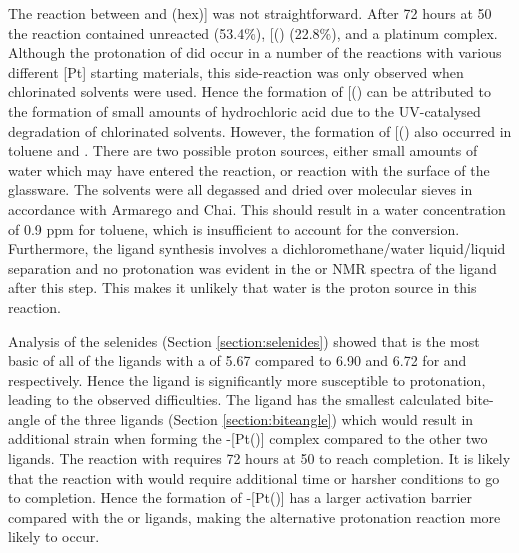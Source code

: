 The reaction between \tBusixantphos{} and \ce{[PtCl2}(\acrshort{hex})] was not straightforward.  After 72 hours at 50\degC{} the reaction contained unreacted \tBusixantphos{} (53.4\%), [(\tBusixantphos)\ce{H]+} (22.8\%), and a platinum complex.  Although the protonation of \tButhixantphos{} did occur in a number of the reactions with various different [Pt] starting materials, this side-reaction was only observed when chlorinated solvents were used.  Hence the formation of [(\tButhixantphos)\ce{H]+} can be attributed to the formation of small amounts of hydrochloric acid due to the UV-catalysed degradation of chlorinated solvents.  However, the formation of [(\tBusixantphos)\ce{H]+} also occurred in toluene and .  There are two possible proton sources, either small amounts of water which may have entered the reaction, or reaction with the surface of the glassware.  The solvents were all degassed and dried over molecular sieves in accordance with Armarego and Chai.\cite{Purificationbook}  This should result in a water concentration of 0.9 ppm for toluene, which is insufficient to account for the conversion.\cite{Williams2010}  Furthermore, the \tBusixantphos{} ligand synthesis involves a dichloromethane/water liquid/liquid separation and no protonation was evident in the \proton{} or \phosphorus{} NMR spectra of the \tBusixantphos{} ligand after this step.  This makes it unlikely that water is the proton source in this reaction.  

Analysis of the \tBuxantphos{} selenides (Section \ref{section:selenides}) showed that \tBusixantphos{} is the most basic of all of the ligands with a \pKb{} of 5.67 compared to 6.90 and 6.72 for \tButhixantphos{} and \tBuxantphos{} respectively.  Hence the \tBusixantphos{} ligand is significantly more susceptible to protonation, leading to the observed difficulties.  The \tBusixantphos{} ligand has the smallest calculated bite-angle of the three ligands (Section \ref{section:biteangle}) which would result in additional strain when forming the \trans-[Pt(\tBusixantphos)] complex compared to the other two ligands.  The reaction with \tButhixantphos{} requires 72 hours at 50 \degC{} to reach completion.  It is likely that the reaction with \tBusixantphos{} would require additional time or harsher conditions to go to completion.  Hence the formation of \trans-[Pt(\tBusixantphos)] has a larger activation barrier compared with the \tButhixantphos{} or \tBuxantphos{} ligands, making the alternative protonation reaction more likely to occur.  

